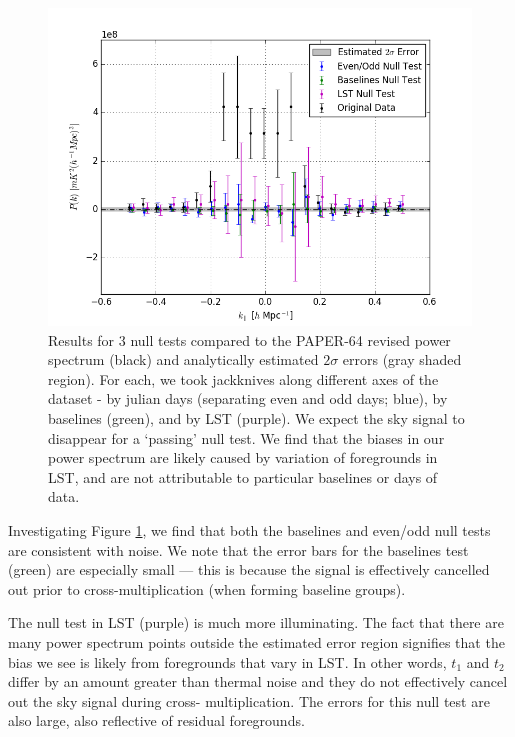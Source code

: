 \documentclass[preprint2,numberedappendix,tighten]{aastex6}  %
\begin{document}
\begin{figure}
	\centering
	\includegraphics[width=\columnwidth]{plots/null.png}
	\caption{Results for $3$ null tests compared to the PAPER-64 revised power spectrum (black) and analytically estimated 
$2\sigma$ errors (gray shaded region). For each, we took jackknives along different axes of the dataset - by julian days (separating 
even and odd days; blue), by baselines (green), and by LST (purple). We expect the sky signal to disappear for a `passing' null test. 
We find that the biases in our power spectrum are likely caused by variation of foregrounds in LST, and are not attributable to 
particular baselines or days of data.}
	\label{fig:null}
\end{figure}

Investigating Figure \ref{fig:null}, we find that both the baselines and even/odd null tests are consistent with noise. We note that 
the error bars for the baselines test (green) are especially small --- this is because the signal is effectively cancelled out prior to 
cross-multiplication (when forming baseline groups). 

The null test in LST (purple) is much more illuminating. The fact that there are many power spectrum points outside the 
estimated error region signifies that the bias we see is likely from foregrounds that vary in LST. In other words, $t_{1}$ and 
$t_{2}$ differ by an amount greater than thermal noise and they do not effectively cancel out the sky signal during cross-
multiplication. The errors for this null test are also large, also reflective of residual foregrounds. 
\end{document}
